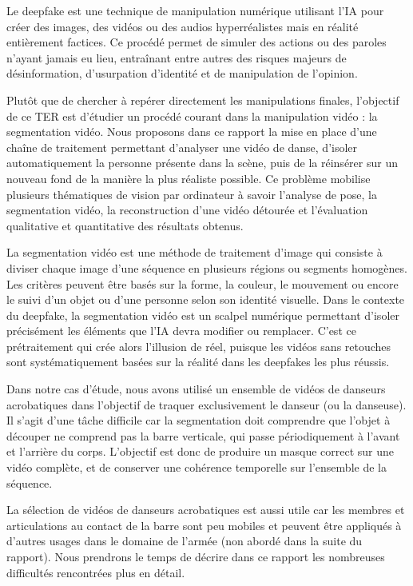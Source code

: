 \documentclass[11pt,a4paper]{article}
\begin{document}
Le deepfake est une technique de manipulation numérique utilisant l'IA pour créer des images, des vidéos ou des audios hyperréalistes mais en réalité entièrement factices.
Ce procédé permet de simuler des actions ou des paroles n'ayant jamais eu lieu, entraînant entre autres des risques majeurs de désinformation, d'usurpation d'identité et de manipulation de l'opinion.

Plutôt que de chercher à repérer directement les manipulations finales, l'objectif de ce TER est d'étudier un procédé courant dans la manipulation vidéo : la segmentation vidéo.
Nous proposons dans ce rapport la mise en place d'une chaîne de traitement permettant d'analyser une vidéo de danse, d'isoler automatiquement la personne présente dans la scène, puis de la réinsérer sur un nouveau fond de la manière la plus réaliste possible.
Ce problème mobilise plusieurs thématiques de vision par ordinateur à savoir l'analyse de pose, la segmentation vidéo, la reconstruction d'une vidéo détourée et l'évaluation qualitative et quantitative des résultats obtenus.

La segmentation vidéo est une méthode de traitement d'image qui consiste à diviser chaque image d'une séquence en plusieurs régions ou segments homogènes. Les critères peuvent être basés sur la forme, la couleur, le mouvement ou encore le suivi d'un objet ou d'une personne selon son identité visuelle.
Dans le contexte du deepfake, la segmentation vidéo est un scalpel numérique permettant d'isoler précisément les éléments que l'IA devra modifier ou remplacer. C'est ce prétraitement qui crée alors l'illusion de réel, puisque les vidéos sans retouches sont systématiquement basées sur la réalité dans les deepfakes les plus réussis.

Dans notre cas d'étude, nous avons utilisé un ensemble de vidéos de danseurs acrobatiques dans l'objectif de traquer exclusivement le danseur (ou la danseuse).
Il s'agit d'une tâche difficile car la segmentation doit comprendre que l'objet à découper ne comprend pas la barre verticale, qui passe périodiquement à l'avant et l'arrière du corps.
L'objectif est donc de produire un masque correct sur une vidéo complète, et de conserver une cohérence temporelle sur l'ensemble de la séquence.

La sélection de vidéos de danseurs acrobatiques est aussi utile car les membres et articulations au contact de la barre sont peu mobiles et peuvent être appliqués à d'autres usages dans le domaine de l'armée (non abordé dans la suite du rapport).
Nous prendrons le temps de décrire dans ce rapport les nombreuses difficultés rencontrées plus en détail.
\end{document}
